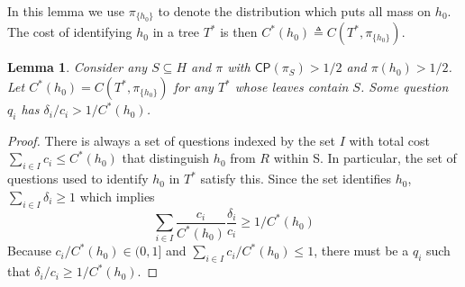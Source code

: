\documentclass{article}
\newtheorem{lemma}{Lemma}
\begin{document}
In this lemma we use $\pi_{\lbrace h_0 \rbrace}$ to denote the distribution which
puts all mass on $h_0$.  The cost of identifying $h_0$ in a 
tree $T^*$ is then $C^*(h_0) \triangleq C(T^*, \pi_{\lbrace h_0 \rbrace})$.
\begin{lemma}Consider any $S \subseteq H$ and $\pi$ 
with $\mathsf{CP}(\pi_S) > 1/2$ and $\pi(h_0) > 1/2$. 
Let $C^*(h_0) = C(T^*, \pi_{\lbrace h_0 \rbrace})$
for any $T^*$ whose leaves contain $S$. 
Some question $q_i$ has $\delta_i / c_i > 1/C^*(h_0)$.
\label{existcutrlma} \end{lemma}
\begin{proof}
There is always a set of questions indexed by the set $I$ with total cost 
$\sum_{i \in I} c_i \leq C^*(h_0)$ that distinguish $h_0$ from $R$ within S.
In particular, the set of questions used to identify $h_0$ in $T^*$ satisfy
this. Since the set identifies $h_0$, $\sum_{i \in I} \delta_i \geq 1$ 
which implies
\[ \sum_{i \in I} \frac{c_i}{C^*(h_0)} \frac{\delta_i}{c_i} \geq 1/C^*(h_0) \]
Because $c_i/C^*(h_0) \in (0, 1]$ and 
$\sum_{i \in I} c_i/C^*(h_0) \leq 1$, there must be a $q_i$ such that 
$\delta_i/c_i \geq 1 / C^*(h_0)$. 
\end{proof}
\end{document}
